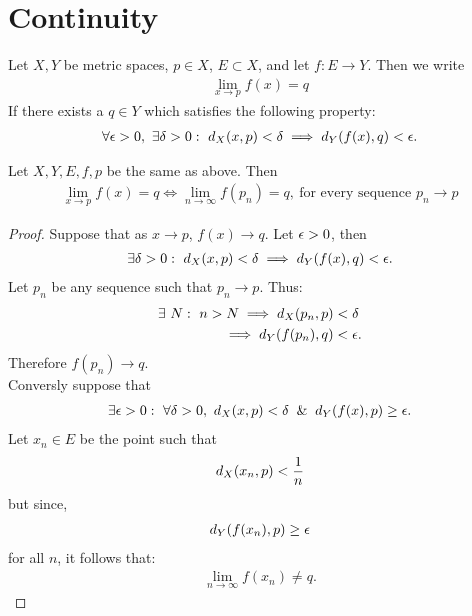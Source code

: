 \section{Continuity}
\begin{definition}
  Let $X,Y$ be metric spaces, $p\in X$, $E\subset X$, and let $f:E\to Y$. Then we write
  \begin{align*}
    \lim_{x\to p} f(x) = q
  \end{align*}
  If there exists a $q\in Y$ which satisfies the following property: 
  \begin{align*}
    \forall \epsilon>0,\ \exists \delta>0:\ d_X(x,p) < \delta \implies d_Y(f(x),q)<\epsilon. 
  \end{align*}
\end{definition}
\begin{theorem}\label{thm:cont}
  Let $X,Y,E,f,p$ be the same as above. Then 
  \begin{align*}
    \lim_{x\to p} f(x) = q \iff \lim_{n\to \infty} f(p_n) = q,\ \text{for every sequence $p_n \to p$} 
  \end{align*}
\end{theorem}
\begin{proof}
  Suppose that as $x\to p$, $f(x) \to q$. Let $\epsilon>0$, then
  \begin{align*}
    \exists\delta>0:\ d_X(x,p) < \delta \implies d_Y(f(x), q)<\epsilon.
  \end{align*}
  Let $p_n$ be any sequence such that $p_n \to p$. Thus:
  \begin{align*}
    \exists\ N:\ n>N \implies d_X(p_n,p) &< \delta\\
    \implies d_Y(f(p_n), q) &< \epsilon.
  \end{align*}
  Therefore $f(p_n) \to q$.\\

  Conversly suppose that
  \begin{align*}
    \exists\e>0:\ \forall\d>0,\ d_X(x,p) < \d \And d_Y(f(x), p) \geq \e.
  \end{align*}
  Let $x_n\in E$ be the point such that
  \begin{align*}
    d_X(x_n, p) < \frac{1}{n}
  \end{align*}
  but since,
  \begin{align*}
    d_Y(f(x_n), p) \geq \epsilon
  \end{align*}
  for all $n$, it follows that:
  \begin{align*}
    \lim_{n\to \infty} f(x_n) \neq q.
  \end{align*}
\end{proof}
